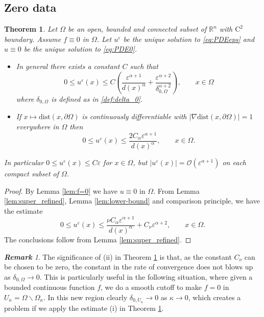 \documentclass[11pt,reqno]{amsart}
\numberwithin{figure}{section}
\theoremstyle{plain}
\newtheorem{thm}{Theorem}[section]
\theoremstyle{remark}
\newtheorem{rem}{\bf{Remark}}
\numberwithin{equation}{section}
\newcommand{\R}{\mathbb{R}}
\begin{document}
\subsection{Zero data}
\begin{thm}\label{thm:rate_doubling0} Let $\Omega$ be an open, bounded and connected subset of $\R^n$ with $\mathrm{C}^2$ boundary. Assume $f\equiv 0$ in $\Omega$. Let $u^\varepsilon$ be the unique solution to \eqref{eq:PDEeps} and $u \equiv 0 $ be the unique solution to \eqref{eq:PDE0}.
\begin{itemize}
    \item[(i)] In general there exists a constant $C$ such that
    \begin{equation*}
    0\leq u^\varepsilon(x)\leq C \left(\frac{ \varepsilon^{\alpha+1}}{d(x)^\alpha} + \frac{\varepsilon^{\alpha+2}}{\delta_{0,\Omega}^{\alpha+2}}\right), \qquad x\in \Omega
\end{equation*}
where $\delta_{0,\Omega}$ is defined as in \eqref{def:delta_0}.
    \item[(ii)] If $x\mapsto \mathrm{dist}(x,\partial\Omega)$ is continuously differentiable with $|\nabla \mathrm{dist}(x,\partial\Omega)| = 1$ everywhere in $\Omega$ then 
    \begin{equation*}
        0\leq u^\varepsilon(x)\leq \frac{2C_\alpha \varepsilon^{\alpha+1}}{d(x)^\alpha}, \qquad x\in \Omega.
    \end{equation*}
\end{itemize}
In particular $0\leq  u^\varepsilon(x) \leq C\varepsilon$ for $x\in \Omega$, but $|u^\varepsilon(x)| = \mathcal{O}\left(\varepsilon^{\alpha+1}\right)$ on each compact subset of $\Omega$.
\end{thm}

\begin{proof} By Lemma \ref{lem:f=0} we have $u \equiv 0$ in $\Omega$. From Lemma \ref{lem:super_refined}, Lemma \ref{lem:lower-bound} and comparison principle, we have the estimate
\begin{equation*}
    0\leq u^\varepsilon(x)\leq \frac{\nu C_\alpha \varepsilon^{\alpha+1}}{d(x)^\alpha} + C_\nu\varepsilon^{\alpha+2}, \qquad x\in \Omega.
\end{equation*}
The conclusions follow from Lemma \ref{lem:super_refined}.
\end{proof}


\begin{rem} The significance of (ii) in Theorem \ref{thm:rate_doubling0} is that, as the constant $C_\nu$ can be chosen to be zero, the constant in the rate of convergence does not blows up as $\delta_{0,\Omega} \to 0$. This is particularly useful in the following situation, where given a bounded continuous function $f$, we do a smooth cutoff to make $f = 0$ in $U_\kappa = \Omega\backslash \Omega_\kappa$. In this new region clearly $\delta_{0,U_\kappa} \to 0$ as $\kappa \to 0$, which creates a problem if we apply the estimate (i) in Theorem \ref{thm:rate_doubling0}.
\end{rem}
\end{document}
